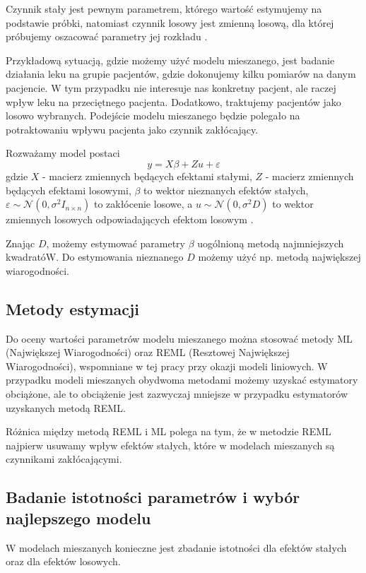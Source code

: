 \documentclass[12pt]{mwbk}
\theoremstyle{plain}
\theoremstyle{definition}
\theoremstyle{remark}
\begin{document}
Czynnik stały jest pewnym parametrem, którego wartość estymujemy na podstawie próbki, natomiast czynnik losowy jest zmienną losową, dla której próbujemy oszacować parametry jej rozkładu \cite{faraway}.
	
Przykładową sytuacją, gdzie możemy użyć modelu mieszanego, jest badanie działania leku na grupie pacjentów, gdzie dokonujemy kilku pomiarów na danym pacjencie. W tym przypadku nie interesuje nas konkretny pacjent, ale raczej wpływ leku na przeciętnego pacjenta. Dodatkowo, traktujemy pacjentów jako losowo wybranych. Podejście modelu mieszanego będzie polegało na potraktowaniu wpływu pacjenta jako czynnik zakłócający. 

Rozważamy model postaci
$$y=X\beta +Z u + \varepsilon$$
gdzie $X$ - macierz zmiennych będących efektami stałymi, $Z$ - macierz zmiennych będących efektami losowymi, $\beta$ to wektor nieznanych efektów stałych, $\varepsilon \sim \mathcal{N}(0, \sigma^2 I_{n\times n})$ to zakłócenie losowe, a $u \sim \mathcal{N} (0, \sigma^2D)$ to wektor zmiennych losowych odpowiadających efektom losowym \cite{biecek}.

Znając $D$, możemy estymować parametry $\beta$ uogólnioną metodą najmniejszych kwadratóW. Do estymowania nieznanego $D$ możemy użyć np. metodą największej wiarogodności.

\subsection{Metody estymacji}

Do oceny wartości parametrów modelu mieszanego można stosować metody ML (Największej Wiarogodności) oraz REML (Resztowej Największej Wiarogodności), wspomniane w tej pracy przy okazji modeli liniowych. W przypadku modeli mieszanych obydwoma metodami możemy uzyskać estymatory obciążone, ale to obciążenie jest zazwyczaj mniejsze w przypadku estymatorów uzyskanych metodą REML.

Różnica między metodą REML i ML polega na tym, że w metodzie REML najpierw usuwamy wpływ efektów stałych, które w modelach mieszanych są czynnikami zakłócającymi.

\subsection{Badanie istotności parametrów i wybór najlepszego modelu}

W modelach mieszanych konieczne jest zbadanie istotności dla efektów stałych oraz dla efektów losowych.
\end{document}
